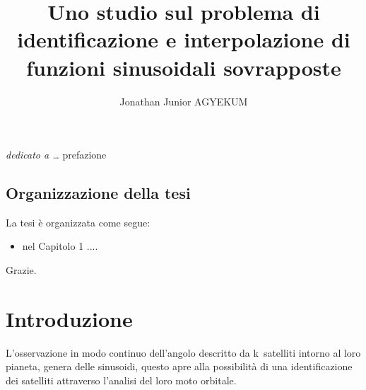 \documentclass[a4paper,12pt]{report}
\begin{document}
\title{Uno studio sul problema di identificazione e interpolazione di funzioni sinusoidali sovrapposte}
\author{Jonathan Junior AGYEKUM}
%
%
%
\beforepreface
\prefacesection{}
        {\hfill \Large {\sl dedicato a \dots}}
%
%
prefazione


%
%
\section*{Organizzazione della tesi}
\label{organizzazione}
La tesi \`e organizzata come segue:
\begin{itemize}
\item nel Capitolo 1 ....
\end{itemize}
%
%
Grazie.
\afterpreface
%
%
\chapter{Introduzione}
\label{cap1}
L'osservazione in modo continuo dell'angolo descritto da  k~satelliti intorno al loro pianeta, genera delle sinusoidi, questo apre alla possibilità di una identificazione dei satelliti attraverso l'analisi del loro moto orbitale.
\end{document}
